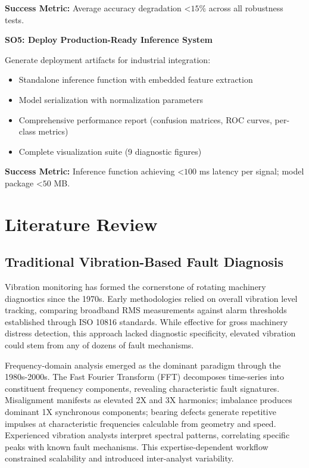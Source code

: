 \documentclass[11pt,a4paper]{article}
\begin{document}
\textbf{Success Metric:} Average accuracy degradation $ $<$  15\%$ across all robustness tests.

\textbf{SO5: Deploy Production-Ready Inference System}

Generate deployment artifacts for industrial integration:
\begin{itemize}[itemsep=0.2em]
    \item Standalone inference function with embedded feature extraction
    \item Model serialization with normalization parameters
    \item Comprehensive performance report (confusion matrices, ROC curves, per-class metrics)
    \item Complete visualization suite (9 diagnostic figures)
\end{itemize}

\textbf{Success Metric:} Inference function achieving $ $<$  100$ ms latency per signal; model package $ $<$  50$ MB.

\section{Literature Review}

\subsection{Traditional Vibration-Based Fault Diagnosis}

Vibration monitoring has formed the cornerstone of rotating machinery diagnostics since the 1970s. Early methodologies relied on overall vibration level tracking, comparing broadband RMS measurements against alarm thresholds established through ISO 10816 standards. While effective for gross machinery distress detection, this approach lacked diagnostic specificity, elevated vibration could stem from any of dozens of fault mechanisms.

Frequency-domain analysis emerged as the dominant paradigm through the 1980s-2000s. The Fast Fourier Transform (FFT) decomposes time-series into constituent frequency components, revealing characteristic fault signatures. Misalignment manifests as elevated 2X and 3X harmonics; imbalance produces dominant 1X synchronous components; bearing defects generate repetitive impulses at characteristic frequencies calculable from geometry and speed. Experienced vibration analysts interpret spectral patterns, correlating specific peaks with known fault mechanisms. This expertise-dependent workflow constrained scalability and introduced inter-analyst variability.
\end{document}
